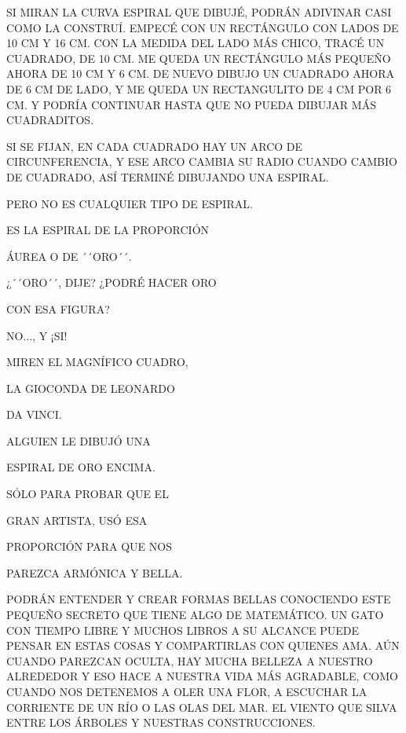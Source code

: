 SI MIRAN LA CURVA ESPIRAL QUE DIBUJÉ, PODRÁN ADIVINAR CASI COMO LA CONSTRUÍ. EMPECÉ CON UN RECTÁNGULO CON LADOS DE 10 CM Y 16 CM. CON LA MEDIDA DEL LADO MÁS CHICO, TRACÉ UN CUADRADO, DE 10 CM. ME QUEDA UN RECTÁNGULO MÁS PEQUEÑO AHORA DE 10 CM Y 6 CM. DE NUEVO DIBUJO UN CUADRADO AHORA DE 6 CM DE LADO, Y ME QUEDA UN RECTANGULITO DE 4 CM POR 6 CM. Y PODRÍA CONTINUAR HASTA QUE NO PUEDA DIBUJAR MÁS CUADRADITOS.

SI SE FIJAN, EN CADA CUADRADO HAY UN ARCO DE CIRCUNFERENCIA, Y ESE ARCO CAMBIA SU RADIO CUANDO CAMBIO DE CUADRADO, ASÍ TERMINÉ DIBUJANDO UNA ESPIRAL.

PERO NO ES CUALQUIER TIPO DE ESPIRAL.
\newpage
{}
ES LA ESPIRAL DE LA PROPORCIÓN

ÁUREA O DE ´´ORO´´.

¿´´ORO´´, DIJE? ¿PODRÉ HACER ORO

CON ESA FIGURA?

NO$\ldots$, Y ¡SI!

MIREN EL MAGNÍFICO CUADRO,

LA GIOCONDA DE LEONARDO

DA VINCI.

ALGUIEN LE DIBUJÓ UNA 

ESPIRAL DE ORO ENCIMA.

SÓLO PARA PROBAR QUE EL

GRAN ARTISTA, USÓ ESA 

PROPORCIÓN PARA QUE NOS

PAREZCA ARMÓNICA Y BELLA.

\newpage
{}
PODRÁN ENTENDER Y CREAR FORMAS BELLAS CONOCIENDO ESTE PEQUEÑO SECRETO QUE TIENE ALGO DE MATEMÁTICO. UN GATO CON TIEMPO LIBRE Y MUCHOS LIBROS A SU ALCANCE PUEDE PENSAR EN ESTAS COSAS Y COMPARTIRLAS CON QUIENES AMA. AÚN CUANDO PAREZCAN OCULTA, HAY MUCHA BELLEZA A NUESTRO ALREDEDOR Y ESO HACE A NUESTRA VIDA MÁS AGRADABLE, COMO CUANDO NOS DETENEMOS A OLER UNA FLOR, A ESCUCHAR LA CORRIENTE DE UN RÍO O LAS OLAS DEL MAR. EL VIENTO QUE SILVA ENTRE LOS ÁRBOLES Y NUESTRAS CONSTRUCCIONES.

